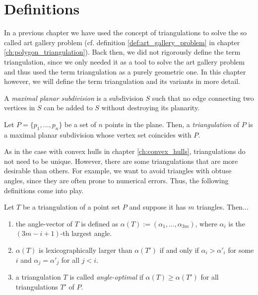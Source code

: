 \section{Definitions}
    In a previous chapter we have used the concept of triangulations to solve the so called art gallery problem (cf. definition \ref{def:art_gallery_problem} in chapter \ref{ch:polygon_triangulation}). Back then, we did not rigorously define the term triangulation, since we only needed it as a tool to solve the art gallery problem and thus used the term triangulation as a purely geometric one. In this chapter however, we will define the term triangulation and its variants in more detail.

    \begin{definition} 
        A \emph{maximal planar subdivision} is a subdivision $S$ such that no edge connecting two vertices in $S$ can be added to $S$ without destroying its planarity.
    \end{definition}

    \begin{definition}[Triangulation] 
        \label{def:triangulation}
        Let $P = \{p_1, \ldots, p_n\}$ be a set of $n$ points in the plane. Then, a \emph{triangulation} of $P$ is a maximal planar subdivision whose vertex set coincides with $P$.
    \end{definition}

    As in the case with convex hulls in chapter \ref{ch:convex_hulls}, triangulations do not need to be unique. However, there are some triangulations that are more desirable than others. For example, we want to avoid triangles with obtuse angles, since they are often prone to numerical errors. Thus, the following definitions come into play.

    \begin{definition} 
        Let $T$ be a triangulation of a point set $P$ and suppose it has $m$ triangles. Then...
        \begin{enumerate}[label=(\roman*)]
            \item the angle-vector of $T$ is defined as $\alpha(T) := (\alpha_1, \dots, \alpha_{3m})$, where $\alpha_i$ is the $(3m - i + 1)$-th largest angle.
            
            \item $\alpha(T)$ is lexicographically larger than $\alpha(T')$ if and only if $\alpha_i > \alpha'_i$ for some $i$ and $\alpha_j = \alpha'_j$ for all $j < i$.
            
            \item a triangulation $T$ is called \emph{angle-optimal} if $\alpha(T) \geq \alpha(T')$ for all triangulations $T'$ of $P$.
        \end{enumerate}
    \end{definition}

